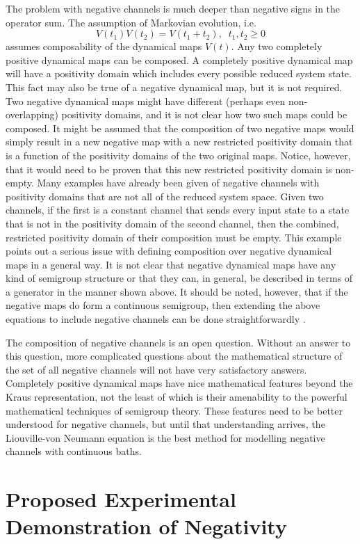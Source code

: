 The problem with negative channels is much deeper than negative signs in the operator sum.  The assumption of Markovian evolution, i.e.\
$$
V(t_1)V(t_2) = V(t_1+t_2),\;\;t_1,t_2\ge 0
$$ 
assumes composability of the dynamical maps $V(t)$.  Any two completely positive dynamical maps can be composed.  A completely positive dynamical map will have a positivity domain which includes every possible reduced system state.  This fact may also be true of a negative dynamical map, but it is not required.  Two negative dynamical maps might have different (perhaps even non-overlapping) positivity domains, and it is not clear how two such maps could be composed.  It might be assumed that the composition of two negative maps would simply result in a new negative map with a new restricted positivity domain that is a function of the positivity domains of the two original maps.  Notice, however, that it would need to be proven that this new restricted positivity domain is non-empty.  Many examples have already been given of negative channels with positivity domains that are not all of the reduced system space.  Given two channels, if the first is a constant channel that sends every input state to a state that is not in the positivity domain of the second channel, then the combined, restricted positivity domain of their composition must be empty.  This example points out a serious issue with defining composition over negative dynamical maps in a general way.  It is not clear that negative dynamical maps have any kind of semigroup structure or that they can, in general, be described in terms of a generator in the manner shown above.  It should be noted, however, that if the negative maps do form a continuous semigroup, then extending the above equations to include negative channels can be done straightforwardly \cite{Shaji2005}.

The composition of negative channels is an open question.  Without an answer to this question, more complicated questions about the mathematical structure of the set of all negative channels will not have very satisfactory answers.  Completely positive dynamical maps have nice mathematical features beyond the Kraus representation, not the least of which is their amenability to the powerful mathematical techniques of semigroup theory.  These features need to be better understood for negative channels, but until that understanding arrives, the Liouville-von Neumann equation is the best method for modelling negative channels with continuous baths.

\section{Proposed Experimental Demonstration of Negativity}
\label{sec:proposedexp}


